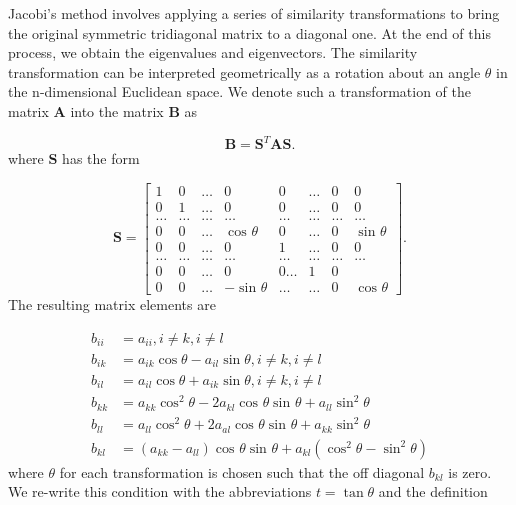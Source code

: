 \documentclass[10pt,showpacs,preprintnumbers,footinbib,amsmath,amssymb,aps,prl,twocolumn,groupedaddress,superscriptaddress,showkeys]{revtex4-1}
\newcommand{\costa}[1]{%
	\ensuremath{\cos ^{#1} {\theta}} }
\newcommand{\sinta}[1]{%
	\ensuremath{\sin ^{#1} {\theta}} }
\begin{document}
{Jacobi's method involves applying a series of similarity transformations
to bring the original symmetric tridiagonal matrix to a diagonal one. At the end
of this process, we obtain the eigenvalues and eigenvectors. The similarity
transformation can be interpreted geometrically as a rotation
about an angle $\theta$ in the n-dimensional Euclidean space. We denote
such a transformation of the matrix $\mathbf{A}$ into the matrix
$\mathbf{B}$ as

\begin{equation*}
	\mathbf{B} = \mathbf{S} ^T \mathbf{A} \mathbf{S}.
\end{equation*}
where $\mathbf{S}$ has the form

\begin{equation*}
	\mathbf{S} = 
	\begin{bmatrix}1 & 0 & \dots   & 0    & 0  & \dots  & 0 & 0 \\
                                0 & 1 & \dots & 0    & 0  & \dots     &0 & 0 \\
			\dots & \dots & \dots & \dots & \dots & \dots & \dots & \dots\\
                                0 & 0 & \dots & \costa{}  & 0   & \dots & 0 & \sinta{} \\
			0 & 0 & \dots & 0 & 1 & \dots & 0 & 0 \\
			\dots & \dots & \dots & \dots & \dots & \dots & \dots & \dots\\
                                0   & 0 & \dots & 0  & 0  \dots  & 1 & 0\\
                                0   & 0 & \dots & - \sinta{}  &\dots & \dots & 0 & \costa{}
	\end{bmatrix}
	.
\end{equation*}
The resulting matrix elements are

\begin{align*}
	b _{ii}  &= a _{ii}, i \neq k, i \neq l\\
	b _{ik} &= a _{ik} \cos{\theta} - a _{il} \sin{\theta}, i \neq k, i \neq l\\
	b _{il}  &= a _{il} \cos{\theta} + a _{ik} \sin{\theta}, i \neq k, i \neq l\\
	b _{kk} &= a _{kk} \costa{2} - 2 a_{kl} \costa{} \sinta{} + a _{ll} \sinta{2}\\
	b _{ll}  &= a _{ll} \costa{2} + 2 a _{al} \costa{} \sinta{} + a _{kk} \sinta{2}\\
	b _{kl} &= (a _{kk} - a _{ll} ) \costa{} \sinta{} + a _{kl} (\costa{2} - \sinta{2} )
\end{align*}
where $\theta$ for each transformation is chosen such that the off diagonal $b _{kl}$
is zero. We re-write this condition with the abbreviations $t = \tan{\theta}$ and the
definition

}
\end{document}

